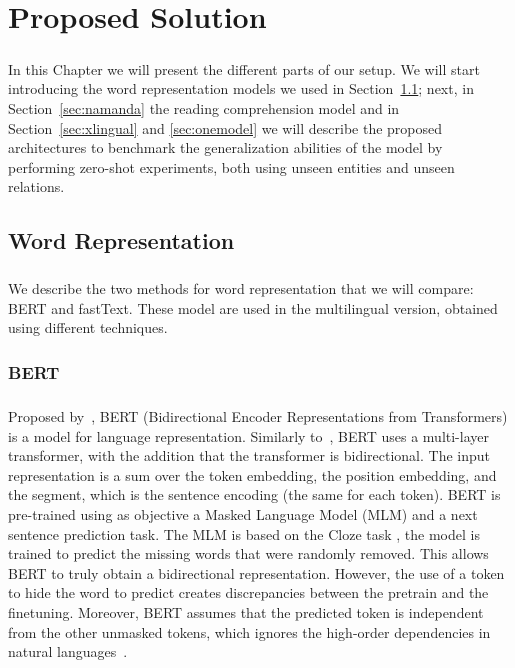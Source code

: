 \chapter{Proposed Solution}
\label{chpt:5}

\paragraph{}
In this Chapter we will present the different parts of our setup. We will start introducing the word representation models we used in Section~\ref{sec:w_e}; next, in Section~\ref{sec:namanda} the reading comprehension model and in Section~\ref{sec:xlingual} and \ref{sec:onemodel} we will describe the proposed architectures to benchmark the generalization abilities of the model by performing zero-shot experiments, both using unseen entities and unseen relations.


\section{Word Representation}
\label{sec:w_e}
\paragraph{}
We describe the two methods for word representation that we will compare: BERT and fastText. These model are used in the multilingual version, obtained using different techniques.

\subsection{BERT}
\paragraph{}
Proposed by~\cite{devlin2018bert}, BERT (Bidirectional Encoder Representations from Transformers) is a model for language representation. Similarly to~\citep{radford2018improving}, BERT uses a multi-layer transformer, with the addition that the transformer is bidirectional. The input representation is a sum over the token embedding, the position embedding, and the segment, which is the sentence encoding (the same for each token). BERT is pre-trained using as objective a Masked Language Model (MLM) and a next sentence prediction task. The MLM is based on the Cloze task \citep{taylor1953cloze}, the model is trained to predict the missing words that were randomly removed. This allows BERT to truly obtain a bidirectional representation. However, the use of a token to hide the word to predict creates discrepancies between the pretrain and the finetuning. Moreover, BERT assumes that the predicted token is independent from the other unmasked tokens, which ignores the high-order dependencies in natural languages~\citep{yang2019xlnet}.


